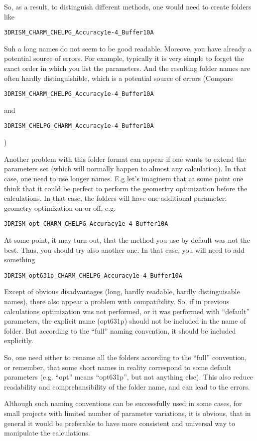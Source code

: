 \documentclass[12pt]{article}
\begin{document}
So, as a result, to distinguish different methods, one would need to create folders like


\verb|3DRISM_CHARM_CHELPG_Accuracy1e-4_Buffer10A|

Suh a long names do not seem to be good readable. 
Moreove, you have already a potential source of errors. 
For example, typically it is very simple to forget the exact order in which you list the parameters. 
And the resulting folder names are often hardly distinguishible, which is a potential source of errors
(Compare 


\verb|3DRISM_CHARM_CHELPG_Accuracy1e-4_Buffer10A|

and 


\verb|3DRISM_CHELPG_CHARM_Accuracy1e-4_Buffer10A|

)

Another problem with this folder format can appear if one wants to extend the parameters set (which will normally happen to almost any calculation).
In that case, one need to use longer names. 
E.g let's imaginem that at some point one  think that it could be perfect to perform the geomertry optimization before the calculations.
In that case, the folders will have one additional parameter: geometry optimization on or off, e.g.

\verb|3DRISM_opt_CHARM_CHELPG_Accuracy1e-4_Buffer10A|

At some point, it may turn out, that the method you use by default was not the best. 
Thus, you should try also another one.
In that case, you will need to add something

\verb|3DRISM_opt631p_CHARM_CHELPG_Accuracy1e-4_Buffer10A|

Except of obvious disadvantages (long, hardly readable, hardly distinguisable names), there also appear a problem with compatibility.
So, if in previous calculations optimization was not performed, or it was performed with ``default'' parameters, the explicit name (opt631p) should not be included in the name of folder.
But according to the ``full'' naming convention, it should be included explicitly.

So, one need either to rename all the folders according to the ``full'' convention, or remember, that some short names in reality correspond to some default parameters (e.g. ``opt'' means ``opt631p'', but not anything else).
This also reduce readability and comprehansibility of the folder name, and can lead to the errors.


Although such naming conventions can be successfully used in some cases, for small projects with limited number of parameter variations, it is obvious, that in general it would be preferable to have more consistent and universal way to manipulate the calculations.
\end{document}
